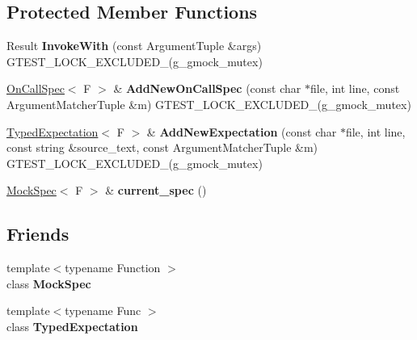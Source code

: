 \subsection*{Protected Member Functions}
\begin{DoxyCompactItemize}
\item 
\mbox{\label{classtesting_1_1internal_1_1_function_mocker_base_a869ec713f000b4e7829c660efc25e8cd}} 
Result {\bfseries Invoke\+With} (const Argument\+Tuple \&args) G\+T\+E\+S\+T\+\_\+\+L\+O\+C\+K\+\_\+\+E\+X\+C\+L\+U\+D\+E\+D\+\_\+(g\+\_\+gmock\+\_\+mutex)
\item 
\mbox{\label{classtesting_1_1internal_1_1_function_mocker_base_a22ece3b6e8d24f11d8f4ba9c17b737c4}} 
\hyperlink{classtesting_1_1internal_1_1_on_call_spec}{On\+Call\+Spec}$<$ F $>$ \& {\bfseries Add\+New\+On\+Call\+Spec} (const char $\ast$file, int line, const Argument\+Matcher\+Tuple \&m) G\+T\+E\+S\+T\+\_\+\+L\+O\+C\+K\+\_\+\+E\+X\+C\+L\+U\+D\+E\+D\+\_\+(g\+\_\+gmock\+\_\+mutex)
\item 
\mbox{\label{classtesting_1_1internal_1_1_function_mocker_base_aa2c35c565f08d3649436af443ece468f}} 
\hyperlink{classtesting_1_1internal_1_1_typed_expectation}{Typed\+Expectation}$<$ F $>$ \& {\bfseries Add\+New\+Expectation} (const char $\ast$file, int line, const string \&source\+\_\+text, const Argument\+Matcher\+Tuple \&m) G\+T\+E\+S\+T\+\_\+\+L\+O\+C\+K\+\_\+\+E\+X\+C\+L\+U\+D\+E\+D\+\_\+(g\+\_\+gmock\+\_\+mutex)
\item 
\mbox{\label{classtesting_1_1internal_1_1_function_mocker_base_a744318106e20b346f4f1efbf5a601644}} 
\hyperlink{classtesting_1_1internal_1_1_mock_spec}{Mock\+Spec}$<$ F $>$ \& {\bfseries current\+\_\+spec} ()
\end{DoxyCompactItemize}
\subsection*{Friends}
\begin{DoxyCompactItemize}
\item 
\mbox{\label{classtesting_1_1internal_1_1_function_mocker_base_ae72aeee91c93e8ae5e1ed7f726a766b2}} 
{\footnotesize template$<$typename Function $>$ }\\class {\bfseries Mock\+Spec}
\item 
\mbox{\label{classtesting_1_1internal_1_1_function_mocker_base_a4f17de55396a8ef740d5ad2b1380a851}} 
{\footnotesize template$<$typename Func $>$ }\\class {\bfseries Typed\+Expectation}
\end{DoxyCompactItemize}

